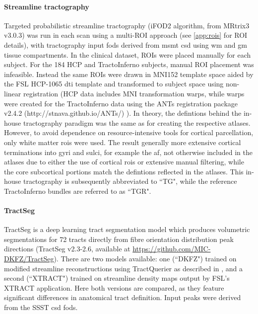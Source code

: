 \paragraph*{Streamline tractography}

Targeted probabilistic streamline tractography (iFOD2 algorithm\autocite{Tournier2010}, from MRtrix3\autocite{Tournier2019} v3.0.3)  was run in each scan using a multi-ROI approach (see \ref{app:rois} for ROI details), with tractography input \glspl{fod} derived from \gls{msmt} \gls{csd} \autocite{Jeurissen2014} using \gls{wm} and \gls{gm} tissue compartments.
In the clinical dataset, ROIs were placed manually for each subject.
For the 184 HCP and TractoInferno subjects, manual ROI placement was infeasible.
Instead the same ROIs were drawn in MNI152 template space aided by the FSL HCP-1065 \gls{dti} template\autocite{FSLATLAS} and transformed to subject space using non-linear registration
(HCP data includes MNI transformation warps, while warps were created for the TractoInferno data using the ANTs registration package v2.4.2 (http://stnava.github.io/ANTs/) \autocite{Tustison2013,Avants2011}).
In theory, the defintions behind the in-house tractography paradigm was the same as for creating the respective atlases.
However, to avoid dependence on resource-intensive tools for cortical parcellation, only white matter \glspl{roi} were used.
The result generally more extensive cortical terminations into gyri and sulci, for example the \gls{af}, not otherwise included in the atlases due to either the use of cortical \glspl{roi} or extensive manual filtering, while the core subcortical portions match the defintions reflected in the atlases. 
This in-house tractography is subsequently abbreviated to ``TG", while the reference TractoInferno bundles are referred to as ``TGR".

\paragraph*{TractSeg}

TractSeg \autocite{Wasserthal2018} is a deep learning tract segmentation model which produces volumetric segmentations for 72 tracts directly from fibre orientation distribution peak directions (TractSeg v2.3-2.6, available at \url{https://github.com/MIC-DKFZ/TractSeg}).
There are two models available: one (``DKFZ") trained on modified streamline reconstructions using TractQuerier \autocite{Wassermann2016} as described in \textcite{Wasserthal2018}, and a second (``XTRACT") trained on streamline density maps output by FSL's XTRACT application. \autocite{Warrington2020}
Here both versions are compared, as they feature significant differences in anatomical tract definition.
Input peaks were derived from the SSST \gls{csd} \glspl{fod}.

